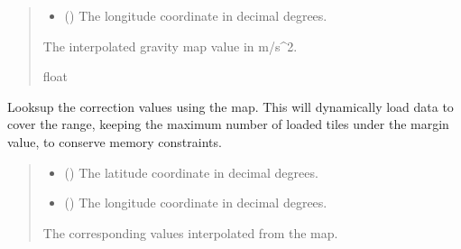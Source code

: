 \documentclass[letterpaper,10pt,english]{sphinxmanual}
\begin{document}
\begin{fulllineitems}
\begin{fulllineitems}
\begin{quote}
\begin{description}
\begin{itemize}
\item {} 
\sphinxAtStartPar
{} () \textendash{} The longitude coordinate in decimal degrees.

\end{itemize}

\sphinxAtStartPar
The interpolated gravity map value in m/s\textasciicircum{}2.

\sphinxAtStartPar
float

\end{description}\end{quote}

\end{fulllineitems}


\begin{fulllineitems}
\label{\detokenize{modules/gravity/ggm_plus:qnav.gravity.ggm_plus.GGMPlusDist.get_map_values}}
\pysigstartsignatures
{}
\pysigstopsignatures
\sphinxAtStartPar
Looks\sphinxhyphen{}up the correction values using the map.
This will dynamically load data to cover the range, keeping the
maximum number of loaded tiles under the margin value, to conserve
memory constraints.
\begin{quote}\begin{description}
\begin{itemize}
\item {} 
\sphinxAtStartPar
{} () \textendash{} The latitude coordinate in decimal degrees.

\item {} 
\sphinxAtStartPar
{} () \textendash{} The longitude coordinate in decimal degrees.

\end{itemize}

\sphinxAtStartPar
The corresponding values interpolated from the map.


\end{description}
\end{quote}
\end{fulllineitems}
\end{fulllineitems}
\end{document}
